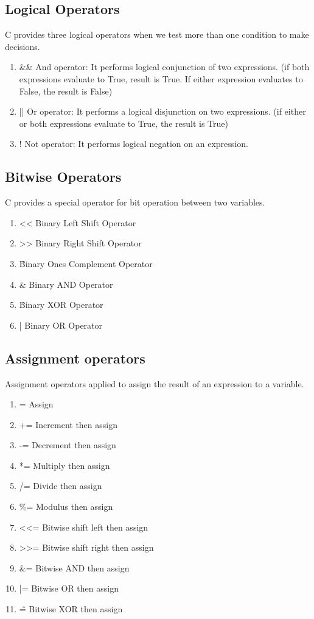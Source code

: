 \subsection{Logical Operators}        
C provides three logical operators when we test more than one condition to make decisions. 

\begin{enumerate}
    \item \&\&   And operator: It performs logical conjunction of two expressions. (if both expressions evaluate to True, result is True. If either expression evaluates to False, the result is False)
    \item ||  Or operator: It performs a logical disjunction on two expressions. (if either or both expressions evaluate to True, the result is True)
    \item !	  Not operator: It performs logical negation on an expression.
\end{enumerate}

\subsection{Bitwise Operators}
C provides a special operator for bit operation between two variables.

\begin{enumerate}
    \item <<	Binary Left Shift Operator
    \item >>	Binary Right Shift Operator
    \item \~	Binary Ones Complement Operator
    \item \&	Binary AND Operator
    \item \^	Binary XOR Operator
    \item |	    Binary OR Operator
\end{enumerate}

\subsection{Assignment operators}
Assignment operators applied to assign the result of an expression to a variable. 

\begin{enumerate}
    \item =     Assign
    \item +=	Increment then assign
    \item -=	Decrement then assign
    \item *=	Multiply then assign
    \item /=	Divide then assign
    \item \%=	Modulus then assign
    \item <<=     Bitwise shift left then assign
    \item >>=     Bitwise shift right then assign
    \item \&=	Bitwise AND then assign
    \item |=	Bitwise OR then assign
    \item \^=	Bitwise XOR then assign
\end{enumerate}


